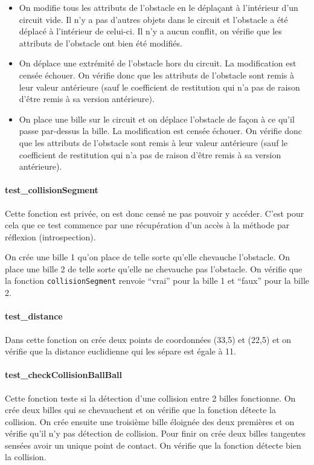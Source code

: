 \documentclass{report}
\begin{document}
\begin{itemize}
\item On modifie tous les attributs de l’obstacle en le déplaçant à l’intérieur d’un circuit vide. Il n’y a pas d’autres objets dans le circuit et l’obstacle a été déplacé à l’intérieur de celui-ci. Il n’y a aucun conflit, on vérifie que les attributs de l’obstacle ont bien été modifiés.
\item On déplace une extrémité de l’obstacle hors du circuit. La modification est censée échouer. On vérifie donc que les attributs de l’obstacle sont remis à leur valeur antérieure (sauf le coefficient de restitution qui n’a pas de raison d’être remis à sa version antérieure).
\item On place une bille sur le circuit et on déplace l’obstacle de façon à ce qu’il passe par-dessus la bille. La modification est censée échouer. On vérifie donc que les attributs de l’obstacle sont remis à leur valeur antérieure (sauf le coefficient de restitution qui n’a pas de raison d’être remis à sa version antérieure).
\end{itemize}

\paragraph{test\_collisionSegment}

Cette fonction est privée, on est donc censé ne pas pouvoir y accéder. C’est pour cela que ce test commence par une récupération d’un accès à la méthode par réflexion (introspection). 

On crée une bille 1 qu’on place de telle sorte qu’elle chevauche l’obstacle. On place une bille 2 de telle sorte qu’elle ne chevauche pas l’obstacle. On vérifie que la fonction \texttt{collisionSegment} renvoie “vrai” pour la bille 1 et “faux” pour la bille 2.

\paragraph{test\_distance}

Dans cette fonction on crée deux points de coordonnées (33,5) et (22,5) et on vérifie que la distance euclidienne qui les sépare est égale à 11.

\paragraph{test\_checkCollisionBallBall}

Cette fonction teste si la détection d’une collision entre 2 billes fonctionne. On crée deux billes qui se chevauchent et on vérifie que la fonction détecte la collision. On crée ensuite une troisième bille éloignée des deux premières et on vérifie qu’il n’y pas détection de collision. Pour finir on crée deux billes tangentes sensées avoir un unique point de contact. On vérifie que la fonction détecte bien la collision.
\end{document}
